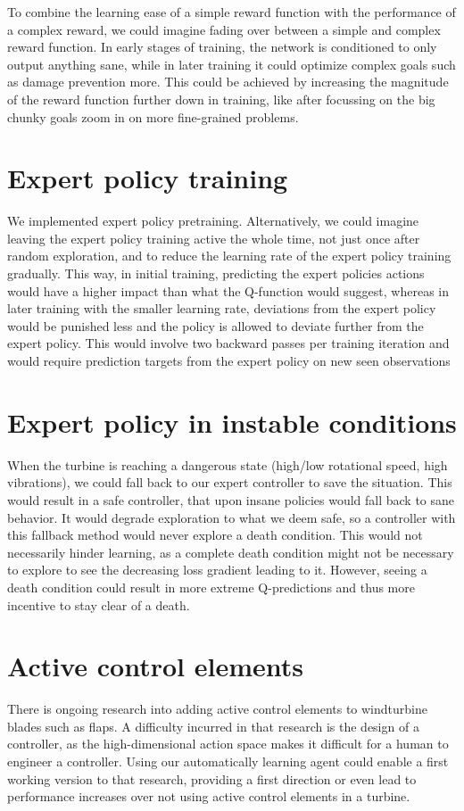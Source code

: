 \documentclass[hyperref,beleg]{cgvpub}
\begin{document}
To combine the learning ease of a simple reward function with the performance of a complex reward, we could imagine fading over between a simple and complex reward function. In early stages of training, the network is conditioned to only output anything sane, while in later training it could optimize complex goals such as damage prevention more. This could be achieved by increasing the magnitude of the reward function further down in training, like after focussing on the big chunky goals zoom in on more fine-grained problems.


\section{Expert policy training}

We implemented expert policy pretraining. Alternatively, we could imagine leaving the expert policy training active the whole time, not just once after random exploration, and to reduce the learning rate of the expert policy training gradually. This way, in initial training, predicting the expert policies actions would have a higher impact than what the Q-function would suggest, whereas in later training with the smaller learning rate, deviations from the expert policy would be punished less and the policy is allowed to deviate further from the expert policy. This would involve two backward passes per training iteration and would require prediction targets from the expert policy on new seen observations

\section{Expert policy in instable conditions}
When the turbine is reaching a dangerous state (high/low rotational speed, high vibrations), we could fall back to our expert controller to save the situation. This would result in a safe controller, that upon insane policies would fall back to sane behavior. It would degrade exploration to what we deem safe, so a controller with this fallback method would never explore a death condition. This would not necessarily hinder learning, as a complete death condition might not be necessary to explore to see the decreasing loss gradient leading to it. However, seeing a death condition could result in more extreme Q-predictions and thus more incentive to stay clear of a death.

\section{Active control elements}
There is ongoing research into adding active control elements to windturbine blades such as flaps. A difficulty incurred in that research is the design of a controller, as the high-dimensional action space makes it difficult for a human to engineer a controller. Using our automatically learning agent could enable a first working version to that research, providing a first direction or even lead to performance increases over not using active control elements in a turbine.
\end{document}

